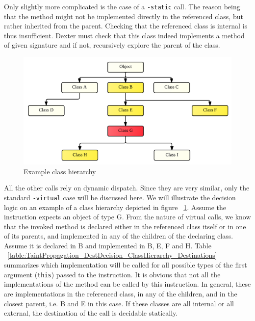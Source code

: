 \documentclass[12pt,twoside,notitlepage]{report}
\begin{document}
Only slightly more complicated is the case of a \verb$-static$ call. The reason being that the method might not be implemented directly in the referenced class, but rather inherited from the parent. Checking that the referenced class is internal is thus insufficient. Dexter must check that this class indeed implements a method of given signature and if not, recursively explore the parent of the class. 

\begin{figure}[h]
	\includegraphics[width=\textwidth]{figs/fig_virtual_call_tree.png}
	\caption{Example class hierarchy}
	\label{fig:TaintPropagation_DestDecision_ClassHierarchy}
\end{figure}

All the other calls rely on dynamic dispatch. Since they are very similar, only the standard \verb$-virtual$ case will be discussed here. We will illustrate the decision logic on an example of a class hierarchy depicted in figure ~\ref{fig:TaintPropagation_DestDecision_ClassHierarchy}. Assume the instruction expects an object of type G. From the nature of virtual calls, we know that the invoked method is declared either in the referenced class itself or in one of its parents, and implemented in any of the children of the declaring class. Assume it is declared in B and implemented in B, E, F and H. Table ~\ref{table:TaintPropagation_DestDecision_ClassHierarchy_Destinations} summarizes which implementation will be called for all possible types of the first argument (\verb$this$) passed to the instruction. It is obvious that not all the implementations of the method can be called by this instruction. In general, these are implementations in the referenced class, in any of the children, and in the closest parent, i.e. B and E in this case. If these classes are all internal or all external, the destination of the call is decidable statically. 
\end{document}

